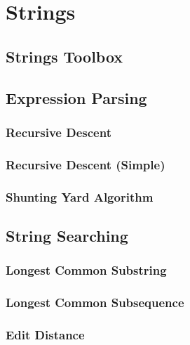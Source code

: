 \chapter{Strings}

\section{Strings Toolbox}
\setcounter{section}{1}


\section{Expression Parsing}
\setcounter{section}{2}
\setcounter{subsection}{0}
\subsection{Recursive Descent}

\subsection{Recursive Descent (Simple)}

\subsection{Shunting Yard Algorithm}


\section{String Searching}
\setcounter{section}{3}
\setcounter{subsection}{0}
\subsection{Longest Common Substring}

\subsection{Longest Common Subsequence}

\subsection{Edit Distance}



